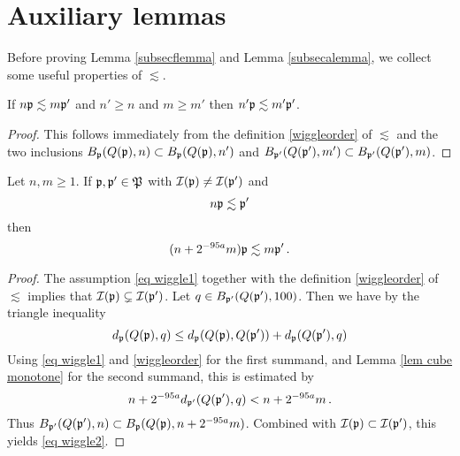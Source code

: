\section{Auxiliary lemmas}

Before proving Lemma \ref{subsecflemma} and Lemma \ref{subsecalemma}, we collect some useful properties of $\lesssim$.

\begin{lemma}
    \label{lem wiggle monotone}
    If $n\mathfrak p \lesssim m\mathfrak p'$ and
    $n' \ge  n$ and $m \ge m'$ then $n'\mathfrak p \lesssim m'\mathfrak p'$.
\end{lemma}

\begin{proof}
    This follows immediately from the definition \eqref{wiggleorder} of $\lesssim$ and the two inclusions $B_{\mathfrak p}(Q(\mathfrak p), n) \subset B_{\mathfrak p}(Q(\mathfrak p), n')$ and $B_{\mathfrak p'}(Q(\mathfrak p'), m') \subset B_{\mathfrak p'}(Q(\mathfrak p'), m)$.
\end{proof}

\begin{lemma}
    \label{lem aux wiggle}
    Let $n, m \ge 1$.
    If $\mathfrak p, \mathfrak p' \in \mathfrak P$ with $\mathcal{I}(\mathfrak p) \ne \mathcal{I}(\mathfrak p')$ and
    \begin{equation}
        \label{eq wiggle1}
        n \mathfrak p \lesssim \mathfrak p'
    \end{equation}
    then
    \begin{equation}
        \label{eq wiggle2}
        (n + 2^{-95 a} m) \mathfrak p \lesssim m\mathfrak p'\,.
    \end{equation}
\end{lemma}

\begin{proof}
    The assumption \eqref{eq wiggle1} together with the definition \eqref{wiggleorder} of $\lesssim$ implies that $\mathcal{I}(\mathfrak p) \subsetneq \mathcal{I}(\mathfrak p')$. Let $q \in B_{\mathfrak p'}(Q(\mathfrak p'), 100)$.  Then we have by the triangle inequality
    $$
        d_{\mathfrak p}(Q(\mathfrak p), q) \le  d_{\mathfrak p}(Q(\mathfrak p), Q(\mathfrak p')) +  d_{\mathfrak p}(Q(\mathfrak p'), q)
    $$
    Using \eqref{eq wiggle1} and \eqref{wiggleorder} for the first summand, and Lemma \ref{lem cube monotone} for the second summand, this is estimated by
    $$
        n + 2^{-95a} d_{\mathfrak p'}(Q(\mathfrak p'), q) < n + 2^{-95a} m\,.
    $$
    Thus $B_{\mathfrak p'}(Q(\mathfrak p'),n) \subset B_{\mathfrak p}(Q(\mathfrak p),n + 2^{-95a}m)$. Combined with $\mathcal{I}(\mathfrak p) \subset \mathcal{I}(\mathfrak p')$, this yields \eqref{eq wiggle2}.
\end{proof}

